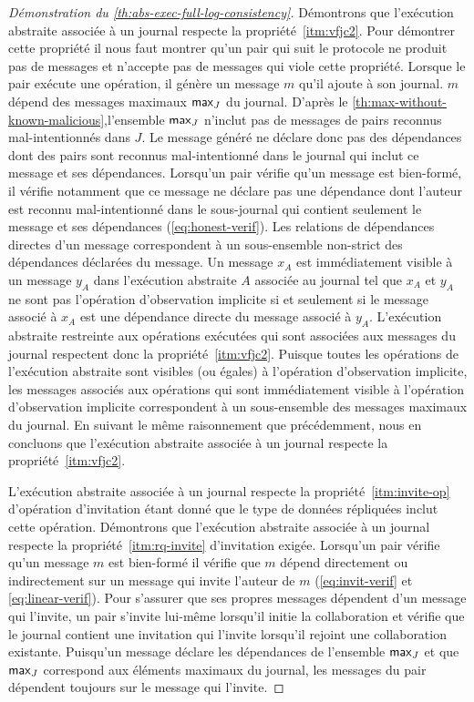 \begin{proof}[Démonstration du \autoref{th:abs-exec-full-log-consistency}]
Démontrons que l'exécution abstraite associée à un journal respecte la propriété~\ref{itm:vfjc2}.
Pour démontrer cette propriété il nous faut montrer qu'un pair qui suit le protocole ne produit pas de messages et n'accepte pas de messages qui viole cette propriété.
Lorsque le pair exécute une opération, il génère un message $m$ qu'il ajoute à son journal.
$m$ dépend des messages maximaux $\operatorname{\mathsf{max}}_J$ du journal.
D'après le \autoref{th:max-without-known-malicious},l'ensemble $\operatorname{\mathsf{max}}_J$ n'inclut pas de messages de pairs reconnus mal-intentionnés dans $J$.
Le message généré ne déclare donc pas des dépendances dont des pairs sont reconnus mal-intentionné dans le journal qui inclut ce message et ses dépendances.
Lorsqu'un pair vérifie qu'un message est bien-formé, il vérifie notamment que ce message ne déclare pas une dépendance dont l'auteur est reconnu mal-intentionné dans le sous-journal qui contient seulement le message et ses dépendances (\autoref{eq:honest-verif}).
Les relations de dépendances directes d'un message correspondent à un sous-ensemble non-strict des dépendances déclarées du message.
Un message $x_A$ est immédiatement visible à un message $y_A$ dans l'exécution abstraite $A$ associée au journal tel que $x_A$ et $y_A$ ne sont pas l'opération d'observation implicite si et seulement si le message associé à $x_A$ est une dépendance directe du message associé à $y_A$.
L'exécution abstraite restreinte aux opérations exécutées qui sont associées aux messages du journal respectent donc la propriété~\ref{itm:vfjc2}.
Puisque toutes les opérations de l'exécution abstraite sont visibles (ou égales) à l'opération d'observation implicite, les messages associés aux opérations qui sont immédiatement visible à l'opération d'observation implicite correspondent à un sous-ensemble des messages maximaux du journal.
En suivant le même raisonnement que précédemment, nous en concluons que l'exécution abstraite associée à un journal respecte la propriété~\ref{itm:vfjc2}.

L'exécution abstraite associée à un journal respecte la propriété~\ref{itm:invite-op} d'opération d'invitation étant donné que le type de données répliquées inclut cette opération.
Démontrons que l'exécution abstraite associée à un journal respecte la propriété~\ref{itm:rq-invite} d'invitation exigée.
Lorsqu'un pair vérifie qu'un message $m$ est bien-formé il vérifie que $m$ dépend directement ou indirectement sur un message qui invite l'auteur de $m$ (\autoref{eq:invit-verif} et \autoref{eq:linear-verif}).
Pour s'assurer que ses propres messages dépendent d'un message qui l'invite, un pair s'invite lui-même lorsqu'il initie la collaboration et vérifie que le journal contient une invitation qui l'invite lorsqu'il rejoint une collaboration existante.
Puisqu'un message déclare les dépendances de l'ensemble $\operatorname{\mathsf{max}}_J$ et que $\operatorname{\mathsf{max}}_J$ correspond aux éléments maximaux du journal, les messages du pair dépendent toujours sur le message qui l'invite.


\end{proof}
